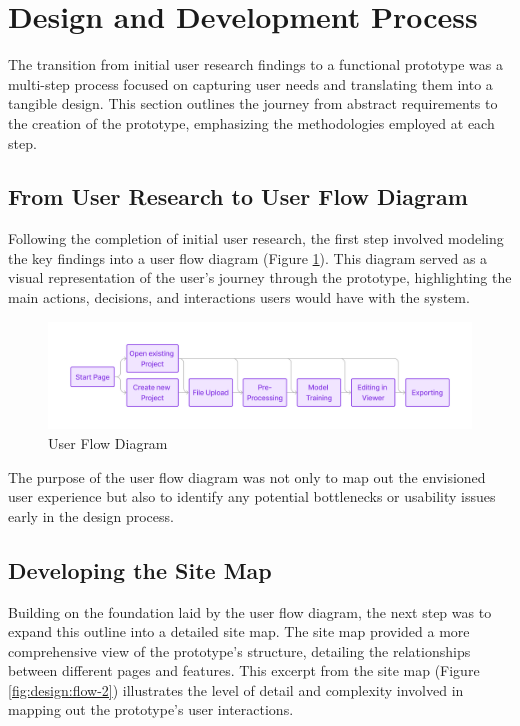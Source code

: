 \section{Design and Development Process}
\label{sec:methodology:design-development}

The transition from initial user research findings to a functional prototype was a multi-step process focused on capturing user needs and translating them into a tangible design. 
This section outlines the journey from abstract requirements to the creation of the prototype, emphasizing the methodologies employed at each step.

\subsection*{From User Research to User Flow Diagram}

Following the completion of initial user research, the first step involved modeling the key findings into a user flow diagram (Figure \ref{fig:design:flow-1}).
This diagram served as a visual representation of the user's journey through the prototype, highlighting the main actions, decisions, and interactions users would have with the system. 

\begin{figure}[htb]
	\includegraphics[width=\textwidth]{figures/flow-1.png}
	\caption{User Flow Diagram}
	\label{fig:design:flow-1}
\end{figure}

The purpose of the user flow diagram was not only to map out the envisioned user experience but also to identify any potential bottlenecks or usability issues early in the design process.

\subsection*{Developing the Site Map}

Building on the foundation laid by the user flow diagram, the next step was to expand this outline into a detailed site map. 
The site map provided a more comprehensive view of the prototype's structure, detailing the relationships between different pages and features. 
This excerpt from the site map (Figure \ref{fig:design:flow-2}) illustrates the level of detail and complexity involved in mapping out the prototype's user interactions.

